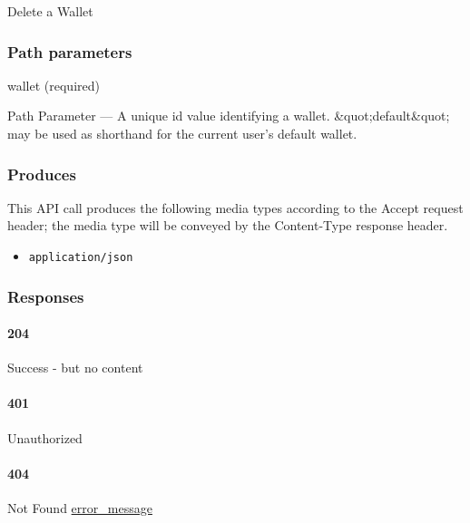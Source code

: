 Delete a Wallet

\hypertarget{path-parameters-108}{%
\subsubsection{Path parameters}\label{path-parameters-108}}

wallet (required)

{Path Parameter} --- A unique id value identifying a wallet.
\&quot;default\&quot; may be used as shorthand for the current user's
default wallet.

\hypertarget{produces-189}{%
\subsubsection{Produces}\label{produces-189}}

This API call produces the following media types according to the
{Accept} request header; the media type will be conveyed by the
{Content-Type} response header.

\begin{itemize}
\tightlist
\item
  \texttt{application/json}
\end{itemize}

\hypertarget{responses-195}{%
\subsubsection{Responses}\label{responses-195}}

\hypertarget{section-627}{%
\paragraph{204}\label{section-627}}

Success - but no content \protect\hyperlink{}{}

\hypertarget{section-628}{%
\paragraph{401}\label{section-628}}

Unauthorized \protect\hyperlink{}{}

\hypertarget{section-629}{%
\paragraph{404}\label{section-629}}

Not Found \protect\hyperlink{error_message}{error\_message}

